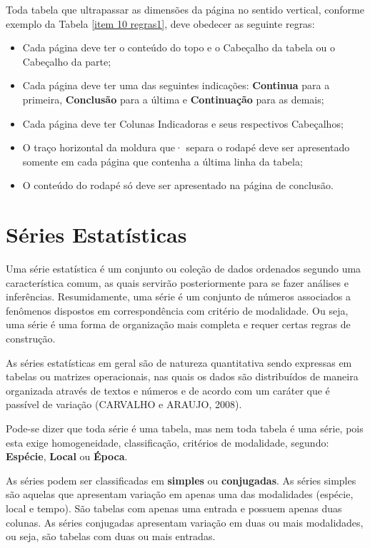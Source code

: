 Toda tabela que ultrapassar as dimensões da página no sentido vertical, conforme exemplo da Tabela \ref{item 10 regras1}, deve obedecer as seguinte regras:

\begin{itemize}
\item [a)] Cada página deve ter o conteúdo do topo e o
Cabeçalho da tabela ou o Cabeçalho da parte;
\item [b)] Cada página deve ter uma das seguintes indicações:
\textbf{Continua} para a primeira, \textbf{Conclusão} para a última e \textbf{Continuação} para as demais;
\item [c)] Cada página deve ter Colunas Indicadoras e seus
respectivos Cabeçalhos;
\item [d)] O traço horizontal da moldura que· separa o rodapé deve ser apresentado somente em cada página que contenha a última linha da tabela;
\item [e)] O conteúdo do rodapé só deve ser apresentado na página de conclusão.
\end{itemize}


\section{Séries Estatísticas}

Uma série estatística é um conjunto ou coleção de dados ordenados segundo uma característica comum, as quais servirão posteriormente para se fazer análises e inferências. Resumidamente, uma série é um conjunto de números associados a fenômenos dispostos em correspondência com critério de modalidade. Ou seja, uma série é uma forma de organização mais completa e requer certas regras de construção.\vskip0.3cm


As séries estatísticas em geral são de natureza quantitativa sendo expressas em tabelas ou matrizes operacionais, nas quais os dados são distribuídos de maneira organizada através de textos e números e de acordo com um caráter que é passível de variação (CARVALHO e ARAUJO, 2008).\vskip0.3cm

Pode-se dizer que toda série é uma tabela, mas nem toda tabela é
uma série, pois esta exige homogeneidade, classificação, critérios
de modalidade, segundo: \textbf{Espécie}, \textbf{Local} ou
\textbf{Época}. \vskip0.3cm

As séries podem ser classificadas em \textbf{simples} ou \textbf{conjugadas}. As séries simples são aquelas que apresentam variação em apenas uma das modalidades (espécie, local e tempo). São tabelas com apenas uma entrada e possuem apenas duas colunas. As séries conjugadas apresentam variação em duas ou mais modalidades, ou seja, são tabelas com duas ou mais entradas.\vskip0.3cm

